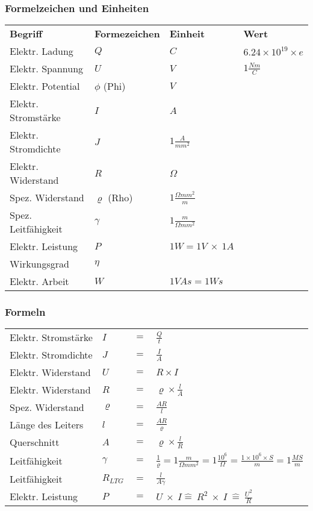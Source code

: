 \subsubsection{Formelzeichen und Einheiten}
\begin{tabular}{llll}
{\bf Begriff}		& {\bf Formezeichen} & {\bf Einheit} & {\bf Wert}\\
Elektr. Ladung		& $Q$ & $C$ & $6.24 \times 10^{19} \times e$\\
Elektr. Spannung		& $U$ & $V$ & $1\frac{Nm}{C}$\\
Elektr. Potential	& $\phi$ (Phi) & $V$ & \\
Elektr. Stromstärke	& $I$ & $A$ & \\
Elektr. Stromdichte	& $J$ & $1\frac{A}{mm^2}$ & \\
Elektr. Widerstand	& $R$ & $\Omega$ & \\
Spez. Widerstand		& $\varrho$ (Rho) & $1\frac{\Omega mm^2}{m}$ & \\
Spez. Leitfähigkeit	& $\gamma$ & $1\frac{m}{\Omega mm^2}$ & \\
Elektr. Leistung		& $P$ & $1W = 1V\ \times\ 1A$ & \\
Wirkungsgrad			& $\eta$ & & \\
Elektr. Arbeit		& $W$ & $1VAs = 1Ws$ & \\
\end{tabular}

\subsubsection{Formeln}
\begin{tabular}{llll}
Elektr. Stromstärke	& $I$ 		& $=$ & $\frac{Q}{t}$\\
Elektr. Stromdichte	& $J$ 		& $=$ & $\frac{I}{A}$\\
Elektr. Widerstand 	& $U$ 		& $=$ & $R\times I$\\
Elektr. Widerstand	& $R$ 		& $=$ & $\varrho\times\frac{l}{A}$\\
Spez. Widerstand		& $\varrho$	& $=$ & $\frac{AR}{l}$\\
Länge des Leiters	& $l$		& $=$ & $\frac{AR}{\varrho}$\\
Querschnitt			& $A$		& $=$ & $\varrho\times\frac{l}{R}$\\
Leitfähigkeit		& $\gamma$	& $=$ & $\frac{1}{\varrho} = 1\frac{m}{\Omega mm^2} = 1\frac{10^6}{\Omega} = \frac{1\times 10^6\times S}{m} = 1\frac{MS}{m}$\\
Leitfähigkeit		& $R_{LTG}$ 	& $=$ & $\frac{l}{A\gamma}$\\
Elektr. Leistung		& $P$ 		& $=$ & $U\ \times\ I \widehat{=}\ R^2\ \times\ I\ \widehat{=}\ \frac{U^2}{R}$\\
\end{tabular}

